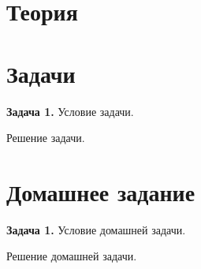 \section{Теория}


\section{Задачи}

\begin{task}\label{task-problems-1}
\textbf{Задача 1.} Условие задачи.
\end{task}

\begin{solution}\label{solution-new-lesson-problems-1}
Решение задачи.
\end{solution}

\section{Домашнее задание}

\begin{task}\label{task-homework-1}
\textbf{Задача 1.} Условие домашней задачи.
\end{task}

\begin{solution}\label{solution-new-lesson-homework-1}
Решение домашней задачи.
\end{solution}
